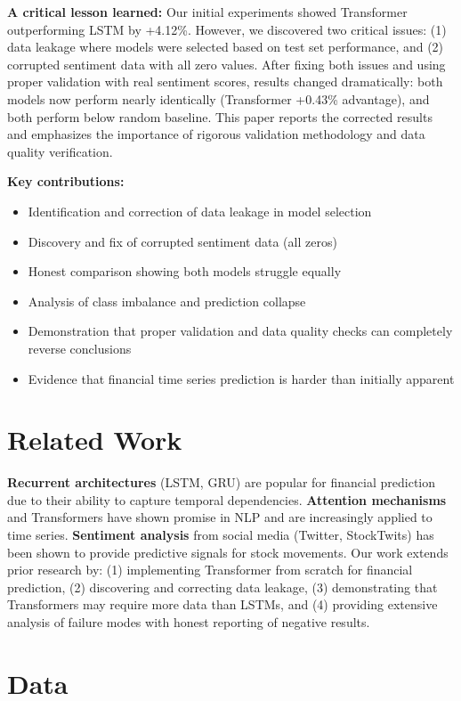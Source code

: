 \documentclass[10pt,twocolumn]{article}
\begin{document}
\textbf{A critical lesson learned:} Our initial experiments showed Transformer outperforming LSTM by +4.12\%. However, we discovered two critical issues: (1) data leakage where models were selected based on test set performance, and (2) corrupted sentiment data with all zero values. After fixing both issues and using proper validation with real sentiment scores, results changed dramatically: both models now perform nearly identically (Transformer +0.43\% advantage), and both perform below random baseline. This paper reports the corrected results and emphasizes the importance of rigorous validation methodology and data quality verification.

\textbf{Key contributions:}
\begin{itemize}
\item Identification and correction of data leakage in model selection
\item Discovery and fix of corrupted sentiment data (all zeros)
\item Honest comparison showing both models struggle equally
\item Analysis of class imbalance and prediction collapse
\item Demonstration that proper validation and data quality checks can completely reverse conclusions
\item Evidence that financial time series prediction is harder than initially apparent
\end{itemize}

\section{Related Work}

\textbf{Recurrent architectures} (LSTM, GRU) are popular for financial prediction due to their ability to capture temporal dependencies. \textbf{Attention mechanisms} and Transformers have shown promise in NLP and are increasingly applied to time series. \textbf{Sentiment analysis} from social media (Twitter, StockTwits) has been shown to provide predictive signals for stock movements. Our work extends prior research by: (1) implementing Transformer from scratch for financial prediction, (2) discovering and correcting data leakage, (3) demonstrating that Transformers may require more data than LSTMs, and (4) providing extensive analysis of failure modes with honest reporting of negative results.

\section{Data}
\end{document}
